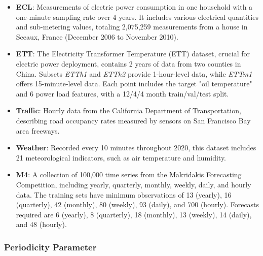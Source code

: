 \vspace{-1em}
\begin{itemize}[leftmargin=*, itemsep=0pt]
    \item \textbf{ECL}: Measurements of electric power consumption in one household with a one-minute sampling rate over 4 years. It includes various electrical quantities and sub-metering values, totaling 2,075,259 measurements from a house in Sceaux, France (December 2006 to November 2010).

    \item \textbf{ETT}: The Electricity Transformer Temperature (ETT) dataset, crucial for electric power deployment, contains 2 years of data from two counties in China. Subsets \textit{ETTh1} and \textit{ETTh2} provide 1-hour-level data, while \textit{ETTm1} offers 15-minute-level data. Each point includes the target "oil temperature" and 6 power load features, with a 12/4/4 month train/val/test split.

    \item \textbf{Traffic}: Hourly data from the California Department of Transportation, describing road occupancy rates measured by sensors on San Francisco Bay area freeways.

    \item \textbf{Weather}: Recorded every 10 minutes throughout 2020, this dataset includes 21 meteorological indicators, such as air temperature and humidity.

    \item \textbf{M4}: A collection of 100,000 time series from the Makridakis Forecasting Competition, including yearly, quarterly, monthly, weekly, daily, and hourly data. The training sets have minimum observations of 13 (yearly), 16 (quarterly), 42 (monthly), 80 (weekly), 93 (daily), and 700 (hourly). Forecasts required are 6 (yearly), 8 (quarterly), 18 (monthly), 13 (weekly), 14 (daily), and 48 (hourly).
\end{itemize}
\vspace{-1em}

\subsubsection{Periodicity Parameter}
\label{appx:periodicity_parameter} 

